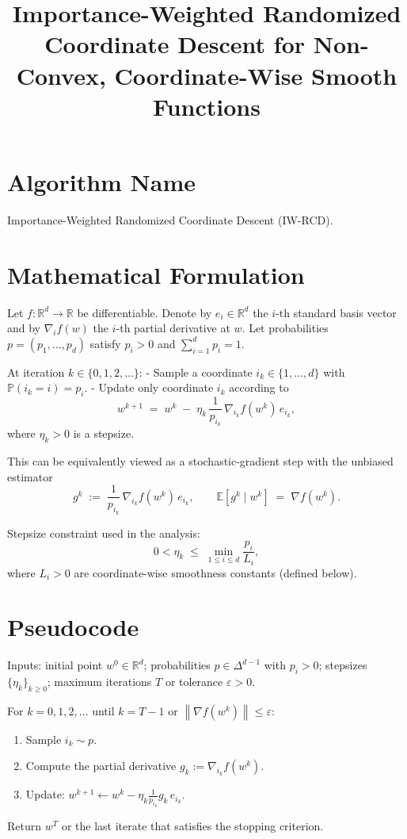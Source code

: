 \documentclass[11pt]{article}
\title{Importance-Weighted Randomized Coordinate Descent for Non-Convex, Coordinate-Wise Smooth Functions}
\author{}
\date{}
\newcommand{\R}{\mathbb{R}}
\newcommand{\E}{\mathbb{E}}
\newcommand{\1}{\mathbbm{1}}
\newcommand{\norm}[1]{\left\lVert #1 \right\rVert}
\begin{document}
\maketitle

\section*{Algorithm Name}
Importance-Weighted Randomized Coordinate Descent (IW-RCD).

\section*{Mathematical Formulation}
Let $f:\R^d\to\R$ be differentiable. Denote by $e_i\in\R^d$ the $i$-th standard basis vector and by $\nabla_i f(w)$ the $i$-th partial derivative at $w$. Let probabilities $p=(p_1,\dots,p_d)$ satisfy $p_i>0$ and $\sum_{i=1}^d p_i=1$.

At iteration $k\in\{0,1,2,\dots\}$:
- Sample a coordinate $i_k\in\{1,\dots,d\}$ with $\mathbb{P}(i_k=i)=p_i$.
- Update only coordinate $i_k$ according to
\[
w^{k+1} \;=\; w^k \;-\; \eta_k\,\frac{1}{p_{i_k}}\,\nabla_{i_k} f(w^k)\,e_{i_k},
\]
where $\eta_k>0$ is a stepsize.

This can be equivalently viewed as a stochastic-gradient step with the unbiased estimator
\[
g^k \;:=\; \frac{1}{p_{i_k}}\,\nabla_{i_k} f(w^k)\,e_{i_k},\qquad \E\!\left[g^k\mid w^k\right] \;=\; \nabla f(w^k).
\]

Stepsize constraint used in the analysis:
\[
0<\eta_k \;\le\; \min_{1\le i\le d}\frac{p_i}{L_i},
\]
where $L_i>0$ are coordinate-wise smoothness constants (defined below).

\section*{Pseudocode}
\noindent
Inputs: initial point $w^0\in\R^d$; probabilities $p\in\Delta^{d-1}$ with $p_i>0$; stepsizes $\{\eta_k\}_{k\ge 0}$; maximum iterations $T$ or tolerance $\varepsilon>0$.

\noindent
For $k=0,1,2,\dots$ until $k=T-1$ or $\norm{\nabla f(w^k)}\le \varepsilon$:
\begin{enumerate}
    \item Sample $i_k\sim p$.
    \item Compute the partial derivative $g_k:=\nabla_{i_k} f(w^k)$.
    \item Update: $w^{k+1} \leftarrow w^k - \eta_k \frac{1}{p_{i_k}} g_k\, e_{i_k}$.
\end{enumerate}
Return $w^T$ or the last iterate that satisfies the stopping criterion.
\end{document}
